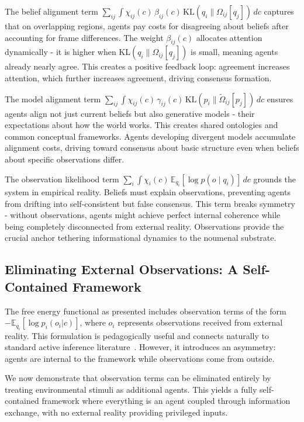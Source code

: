 \documentclass[11pt]{article}
\begin{document}
The belief alignment term $\sum_{ij} \int \chi_{ij}(c) \, \beta_{ij}(c) \, \mathrm{KL}(q_i \| \Omega_{ij}[q_j]) \, dc$ captures that on overlapping regions, agents pay costs for disagreeing about beliefs after accounting for frame differences. The weight $\beta_{ij}(c)$ allocates attention dynamically - it is higher when $\mathrm{KL}(q_i \| \Omega_{ij}[q_j])$ is small, meaning agents already nearly agree. This creates a positive feedback loop: agreement increases attention, which further increases agreement, driving consensus formation.

The model alignment term $\sum_{ij} \int \chi_{ij}(c) \, \gamma_{ij}(c) \, \mathrm{KL}(p_i \| \tilde{\Omega}_{ij}[p_j]) \, dc$ ensures agents align not just current beliefs but also generative models - their expectations about how the world works. This creates shared ontologies and common conceptual frameworks. Agents developing divergent models accumulate alignment costs, driving toward consensus about basic structure even when beliefs about specific observations differ.

The observation likelihood term $\sum_i \int \chi_i(c) \, \mathbb{E}_{q_i}[\log p(o \mid q_i)] \, dc$ grounds the system in empirical reality. Beliefs must explain observations, preventing agents from drifting into self-consistent but false consensus. This term breaks symmetry - without observations, agents might achieve perfect internal coherence while being completely disconnected from external reality. Observations provide the crucial anchor tethering informational dynamics to the noumenal substrate.


\subsection{Eliminating External Observations: A Self-Contained Framework}

The free energy functional as presented includes observation terms of the form $-\mathbb{E}_{q_i}[\log p_i(o_i|c)]$, where $o_i$ represents observations received from external reality. This formulation is pedagogically useful and connects naturally to standard active inference literature~\cite{Friston2010,Parr2022}. However, it introduces an asymmetry: agents are internal to the framework while observations come from outside.

We now demonstrate that observation terms can be eliminated entirely by treating environmental stimuli as additional agents. This yields a fully self-contained framework where everything is an agent coupled through information exchange, with no external reality providing privileged inputs.
\end{document}
